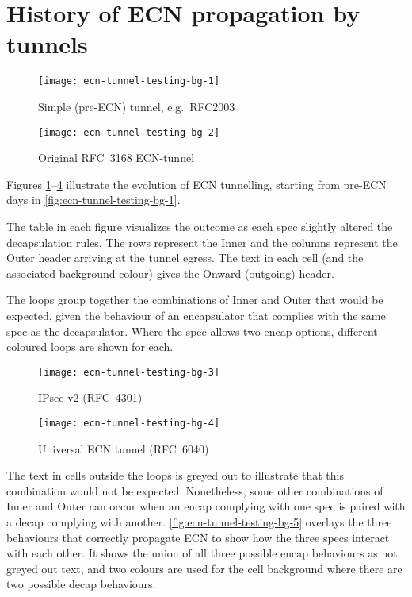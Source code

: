 \section{History of ECN propagation by tunnels}\label{ecn-encap-test_History}

\begin{figure}[h]
	\centering
	\texttt{[image: ecn-tunnel-testing-bg-1]}
	\caption{Simple (pre-ECN) tunnel, e.g.\ RFC2003}\label{fig:ecn-tunnel-testing-bg-1}
\end{figure}
\begin{figure}[h]
	\centering
	\texttt{[image: ecn-tunnel-testing-bg-2]}
	\caption{Original RFC~3168 ECN-tunnel~\cite{rfc3168}}\label{fig:ecn-tunnel-testing-bg-2}
\end{figure}

Figures \ref{fig:ecn-tunnel-testing-bg-1}--\ref{fig:ecn-tunnel-testing-bg-4}
illustrate the evolution of ECN tunnelling, starting from pre-ECN days in
\autoref{fig:ecn-tunnel-testing-bg-1}.

The table in each figure visualizes the outcome as each spec slightly altered
the decapsulation rules. The rows represent the Inner and the columns represent
the Outer header arriving at the tunnel egress. The text in each cell (and the
associated background colour) gives the Onward (outgoing) header.

The loops group together the combinations of Inner and Outer that would be
expected, given the behaviour of an encapsulator that complies with the same
spec as the decapsulator. Where the spec allows two encap options, different
coloured loops are shown for each.

\newpage
\begin{figure}[h]
	\centering
	\texttt{[image: ecn-tunnel-testing-bg-3]}
	\caption{IPsec v2 (RFC~4301)~\cite{IETF_RFC4301:IPSEC_architecture}}\label{fig:ecn-tunnel-testing-bg-3}
\end{figure}
\begin{figure}[h]
	\centering
	\texttt{[image: ecn-tunnel-testing-bg-4]}
	\caption{Universal ECN tunnel (RFC~6040)~\cite{Briscoe07b:ECN-tunnel}}\label{fig:ecn-tunnel-testing-bg-4}
\end{figure}

The text in cells outside the loops is greyed out to illustrate that this
combination would not be expected. Nonetheless, some other combinations of Inner
and Outer can occur when an encap complying with one spec is paired with a decap
complying with another. \autoref{fig:ecn-tunnel-testing-bg-5} overlays the three
behaviours that correctly propagate ECN to show how the three specs interact
with each other. It shows the union of all three possible encap behaviours as
not greyed out text, and two colours are used for the cell background where
there are two possible decap behaviours.

